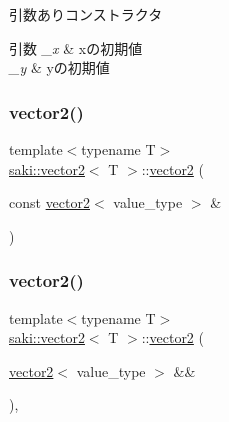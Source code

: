 引数ありコンストラクタ 


\begin{DoxyParams}{引数}
{\em \+\_\+x} & xの初期値 \\
\hline
{\em \+\_\+y} & yの初期値 \\
\hline
\end{DoxyParams}
\mbox{\label{classsaki_1_1vector2_a10bf1b89f32e86f02e065d099d2a393c}} 
\subsubsection{\texorpdfstring{vector2()}{vector2()}\hspace{0.1cm}{\footnotesize\ttfamily [3/4]}}
{\footnotesize\ttfamily template$<$typename T$>$ \\
\mbox{\hyperlink{classsaki_1_1vector2}{saki\+::vector2}}$<$ T $>$\+::\mbox{\hyperlink{classsaki_1_1vector2}{vector2}} (\begin{DoxyParamCaption}\item[{const \mbox{\hyperlink{classsaki_1_1vector2}{vector2}}$<$ value\+\_\+type $>$ \&}]{ }\end{DoxyParamCaption})\hspace{0.3cm}{\ttfamily [default]}}

\mbox{\label{classsaki_1_1vector2_af19b2ba1f8433ef4feeff2cabae128d2}} 
\subsubsection{\texorpdfstring{vector2()}{vector2()}\hspace{0.1cm}{\footnotesize\ttfamily [4/4]}}
{\footnotesize\ttfamily template$<$typename T$>$ \\
\mbox{\hyperlink{classsaki_1_1vector2}{saki\+::vector2}}$<$ T $>$\+::\mbox{\hyperlink{classsaki_1_1vector2}{vector2}} (\begin{DoxyParamCaption}\item[{\mbox{\hyperlink{classsaki_1_1vector2}{vector2}}$<$ value\+\_\+type $>$ \&\&}]{ }\end{DoxyParamCaption})\hspace{0.3cm}{\ttfamily [default]}, {\ttfamily [noexcept]}}

